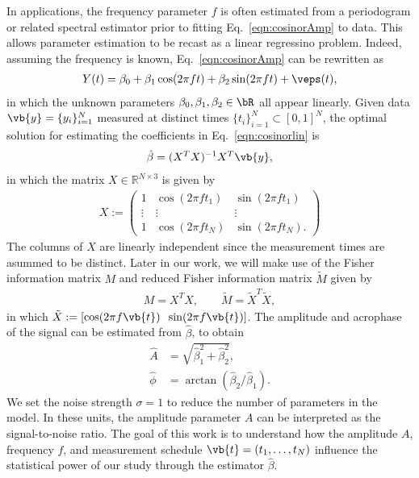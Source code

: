 In applications, the frequency parameter $f$ is often estimated from a periodogram or related spectral estimator prior to fitting Eq.~\eqref{eqn:cosinorAmp}  to data. This allows parameter estimation to be recast as a linear regressino problem. Indeed, assuming the frequency is known,  Eq.~\eqref{eqn:cosinorAmp} can be rewritten as
\begin{align}
    Y(t) = \beta_0 + \beta_1 \cos(2\pi f t ) + \beta_2 \sin(2\pi f t) + \veps(t), \label{eqn:cosinorlin}
\end{align}
in which the unknown parameters $\beta_0,\beta_1, \beta_2 \in \bR$ all appear linearly. Given data $\vb{y}=\{y_i\}_{i=1}^{N}$ measured at distinct times $\{t_i\}_{i=1}^{N} \subset [0,1]^N$, the optimal solution for estimating the coefficients in Eq.~\eqref{eqn:cosinorlin} is 
\begin{align}
    \hat{\beta} = (X^T X)^{-1}X^T \vb{y},\label{eqn:betahat}
\end{align}
in which the matrix $X\in \mathbb{R}^{N\times 3}$ is given by
\begin{align}\label{eqn:matX}
    X := \begin{pmatrix}
        1 & \cos(2\pi f t_1) & \sin(2\pi f t_1) \\
       \vdots  &  \vdots             & \vdots \\
        1 & \cos(2\pi f t_N) & \sin(2\pi f t_N). 
    \end{pmatrix}
\end{align}
The columns of $X$ are linearly independent since the measurement times are asummed to be distinct. Later in our work, we will make use of the Fisher information matrix $M$ and reduced Fisher information matrix $\tilde{M}$ given by
\begin{align}
    M = X^T X , \quad\quad \tilde{M} = \tilde{X}^T \tilde{X}, \label{eqn:FIM}
\end{align}
in which $\tilde{X} := [\cos(2\pi f \vb{t}) \;\; \sin(2\pi f \vb{t})]$. The amplitude and acrophase of the signal can be estimated from $\hat{\beta}$, to obtain
\begin{align}
    \hat{A} &= \sqrt{\hat{\beta}_1^2 + \hat{\beta}_2^2}, \label{eqn:amp}\\
    \hat{\phi} &= \arctan{(\hat{\beta}_2/\hat{\beta}_1)}\label{eqn:acro}.
\end{align}
We set the noise strength $\sigma=1$ to reduce the number of parameters in the model. In these units, the amplitude parameter $A$ can be interpreted as the signal-to-noise ratio. The goal of this work is to understand how the amplitude $A$, frequency $f$, and measurement schedule $\vb{t}=(t_1,\ldots,t_N)$ influence the statistical power of our study through the estimator $\hat{\beta}$.

